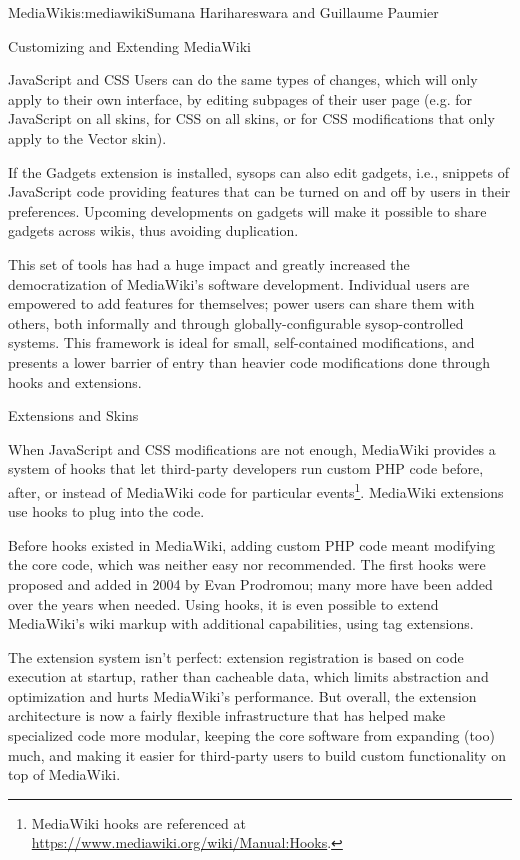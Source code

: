 \begin{aosachapter}{MediaWiki}{s:mediawiki}{Sumana Harihareswara and Guillaume Paumier}
\begin{aosasect1}{Customizing and Extending MediaWiki}
\begin{aosasect2}{JavaScript and CSS}
Users can do the same types of changes, which will only apply to their
own interface, by editing subpages of their user page
(e.g.  for
JavaScript on all skins,
 for CSS on
all skins, or 
for CSS modifications that only apply to the Vector skin).

If the Gadgets extension is installed, sysops can also edit gadgets,
i.e., snippets of JavaScript code providing features that can be turned
on and off by users in their preferences. Upcoming developments on
gadgets will make it possible to share gadgets across wikis, thus
avoiding duplication.

This set of tools has had a huge impact and greatly increased the
democratization of MediaWiki's software development. Individual users
are empowered to add features for themselves; power users can share
them with others, both informally and through globally-configurable
sysop-controlled systems. This framework is ideal for small,
self-contained modifications, and presents a lower barrier of entry
than heavier code modifications done through hooks and extensions.

\end{aosasect2}

\begin{aosasect2}{Extensions and Skins}

When JavaScript and CSS modifications are not enough, MediaWiki
provides a system of hooks that let third-party developers run custom
PHP code before, after, or instead of MediaWiki code for particular
events\footnote{MediaWiki hooks are referenced at
  \url{https://www.mediawiki.org/wiki/Manual:Hooks}.}. MediaWiki
extensions use hooks to plug into the code.

Before hooks existed in MediaWiki, adding custom PHP code meant
modifying the core code, which was neither easy nor recommended. The
first hooks were proposed and added in 2004 by Evan Prodromou; many
more have been added over the years when needed. Using hooks, it is
even possible to extend MediaWiki's wiki markup with additional
capabilities, using tag extensions.

The extension system isn't perfect: extension registration is based on
code execution at startup, rather than cacheable data, which limits
abstraction and optimization and hurts MediaWiki's performance. But
overall, the extension architecture is now a fairly flexible
infrastructure that has helped make specialized code more modular,
keeping the core software from expanding (too) much, and making it
easier for third-party users to build custom functionality on top of
MediaWiki.


\end{aosasect2}
\end{aosasect1}
\end{aosachapter}
